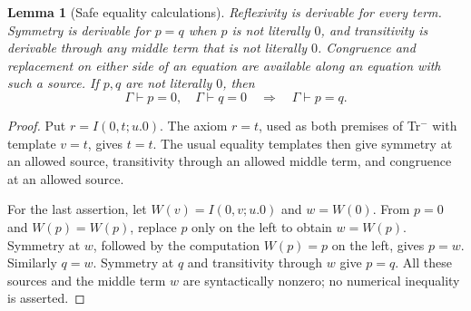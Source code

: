 \documentclass[11pt,letterpaper]{article}
\newtheorem{lemma}[theorem]{Lemma}
\theoremstyle{definition}\newtheorem{definition}[theorem]{Definition}
\theoremstyle{remark}\newtheorem{remark}[theorem]{Remark}
\begin{document}
\begin{lemma}[Safe equality calculations]\label{lem:safe-equality}
Reflexivity is derivable for every term.  Symmetry is derivable for $p=q$
when $p$ is not literally $0$, and transitivity is derivable through any
middle term that is not literally $0$.  Congruence and replacement on
either side of an equation are available along an equation with such a
source.  If $p,q$ are not literally $0$, then
\[
 \Gamma\vdash p=0,\quad\Gamma\vdash q=0
 \quad\Longrightarrow\quad\Gamma\vdash p=q.
 \tag{Zero join}\label{eq:zero-join}
\]
\end{lemma}
\begin{proof}
Put $r=I(0,t;u.0)$.  The axiom $r=t$, used as both premises of
Tr$^{-}$ with template $v=t$, gives $t=t$.  The usual equality
templates then give symmetry at an allowed source, transitivity through
an allowed middle term, and congruence at an allowed source.

For the last assertion, let $W(v)=I(0,v;u.0)$ and $w=W(0)$.  From
$p=0$ and $W(p)=W(p)$, replace $p$ only on the left to obtain
$w=W(p)$.  Symmetry at $w$, followed by the computation $W(p)=p$
on the left, gives $p=w$.  Similarly $q=w$.  Symmetry at $q$ and
transitivity through $w$ give $p=q$.  All these sources and the middle
term $w$ are syntactically nonzero; no numerical inequality is asserted.
\end{proof}
\end{document}
